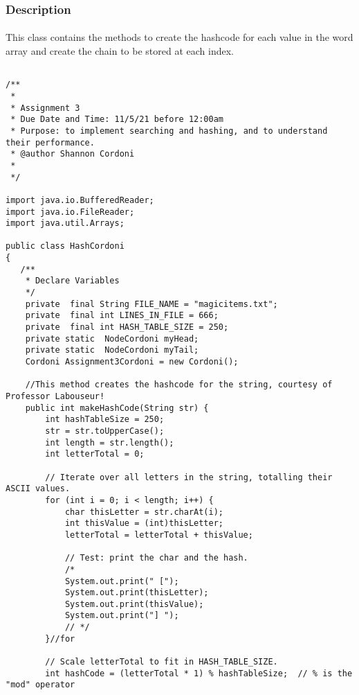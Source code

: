 \documentclass[letterpaper, 10pt,DIV=13]{scrartcl}
\numberwithin{equation}{section} %
\numberwithin{figure}{section} %
\numberwithin{table}{section} %
\begin{document}
\subsubsection{Description}
\paragraph{} This class contains the methods to create the hashcode for each value in the word array and create the chain to be stored at each index. 

\lstset{numbers=left, numberstyle=\tiny, stepnumber=1, numbersep=5pt, basicstyle=\footnotesize\ttfamily}
\begin{lstlisting}[frame=single, ] 

/** 
 * 
 * Assignment 3
 * Due Date and Time: 11/5/21 before 12:00am 
 * Purpose: to implement searching and hashing, and to understand their performance.
 * @author Shannon Cordoni 
 * 
 */

import java.io.BufferedReader;
import java.io.FileReader;
import java.util.Arrays;

public class HashCordoni
{
   /**
    * Declare Variables 
    */
    private  final String FILE_NAME = "magicitems.txt";
    private  final int LINES_IN_FILE = 666;
    private  final int HASH_TABLE_SIZE = 250;
    private static  NodeCordoni myHead;
    private static  NodeCordoni myTail;
    Cordoni Assignment3Cordoni = new Cordoni();

    //This method creates the hashcode for the string, courtesy of Professor Labouseur!
    public int makeHashCode(String str) {
        int hashTableSize = 250;
        str = str.toUpperCase();
        int length = str.length();
        int letterTotal = 0;
        
        // Iterate over all letters in the string, totalling their ASCII values.
        for (int i = 0; i < length; i++) {
            char thisLetter = str.charAt(i);
            int thisValue = (int)thisLetter;
            letterTotal = letterTotal + thisValue;
            
            // Test: print the char and the hash.
            /* 
            System.out.print(" ["); 
            System.out.print(thisLetter); 
            System.out.print(thisValue); 
            System.out.print("] "); 
            // */
        }//for
  
        // Scale letterTotal to fit in HASH_TABLE_SIZE.
        int hashCode = (letterTotal * 1) % hashTableSize;  // % is the "mod" operator
        

\end{lstlisting}
\end{document}
